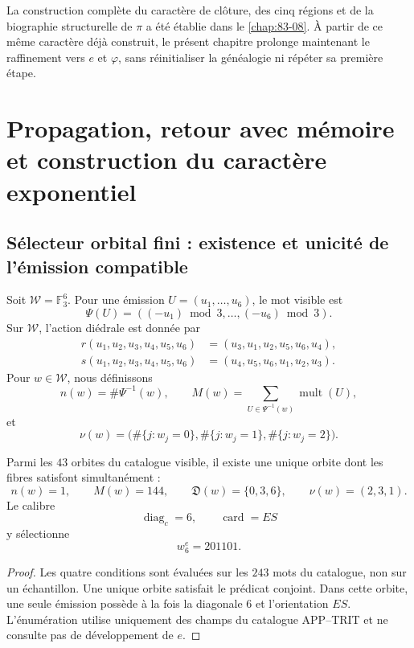 La construction complète du caractère de clôture, des cinq régions et de la
biographie structurelle de \(\pi\) a été établie dans le
\cref{chap:83-08}. À partir de ce même caractère déjà construit, le présent
chapitre prolonge maintenant le raffinement vers \(e\) et \(\varphi\), sans
réinitialiser la généalogie ni répéter sa première étape.



\section{Propagation, retour avec mémoire et construction du caractère exponentiel}
\label{p12-83-c9-s2:chap:biografia-completa-e}

\subsection{Sélecteur orbital fini : existence et unicité de l’émission compatible}

Soit \(\mathcal W=\mathbb F_3^6\). Pour une émission
\(U=(u_1,\ldots,u_6)\), le mot visible est
\[
 \Psi(U)=((-u_1)\bmod3,\ldots,(-u_6)\bmod3).
\]
Sur \(\mathcal W\), l’action diédrale est donnée par
\[
\begin{aligned}
 r(u_1,u_2,u_3,u_4,u_5,u_6)
 &=(u_3,u_1,u_2,u_5,u_6,u_4),\\
 s(u_1,u_2,u_3,u_4,u_5,u_6)
 &=(u_4,u_5,u_6,u_1,u_2,u_3).
\end{aligned}
\]
Pour \(w\in\mathcal W\), nous définissons
\[
 n(w)=\#\Psi^{-1}(w),
 \qquad
 M(w)=\sum_{U\in\Psi^{-1}(w)}\operatorname{mult}(U),
\]
et
\[
 \nu(w)=
 \bigl(
 \#\{j:w_j=0\},
 \#\{j:w_j=1\},
 \#\{j:w_j=2\}
 \bigr).
\]

\begin{theorem}
\label{p12-83-c9-s2:thm:seleccion-estructural-e}
Parmi les \(43\) orbites du catalogue visible, il existe une unique orbite dont les
fibres satisfont simultanément :
\[
 n(w)=1,\qquad M(w)=144,\qquad
 \mathfrak D(w)=\{0,3,6\},\qquad
 \nu(w)=(2,3,1).
\]
Le calibre
\[
 \operatorname{diag}_c=6,
 \qquad \operatorname{card}=ES
\]
y sélectionne
\[
 \boxed{w_6^e=201101.}
\]
\end{theorem}

\begin{proof}
Les quatre conditions sont évaluées sur les \(243\) mots du catalogue,
non sur un échantillon. Une unique orbite satisfait le prédicat conjoint. Dans
cette orbite, une seule émission possède à la fois la diagonale \(6\) et l’orientation
\(ES\). L’énumération utilise uniquement des champs du catalogue APP--TRIT et ne
consulte pas de développement de \(e\).
\end{proof}

